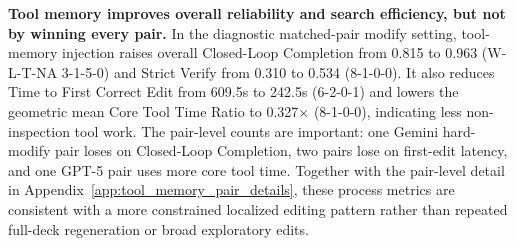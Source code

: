 \noindent\textbf{Tool memory improves overall reliability and search efficiency, but not by winning every pair.}
In the diagnostic matched-pair modify setting, tool-memory injection raises
overall Closed-Loop Completion from 0.815 to 0.963 (W-L-T-NA 3-1-5-0) and
Strict Verify from 0.310 to 0.534 (8-1-0-0). It also reduces Time to First
Correct Edit from 609.5s to 242.5s (6-2-0-1) and lowers the geometric mean
Core Tool Time Ratio to 0.327$\times$ (8-1-0-0), indicating less
non-inspection tool work. The pair-level counts are important: one Gemini
hard-modify pair loses on Closed-Loop Completion, two pairs lose on first-edit
latency, and one GPT-5 pair uses more core tool time. Together with the
pair-level detail in Appendix~\ref{app:tool_memory_pair_details}, these process
metrics are consistent with a more constrained localized editing pattern rather
than repeated full-deck regeneration or broad exploratory edits.

\FloatBarrier
